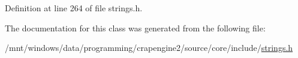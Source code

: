 Definition at line 264 of file strings.\+h.



The documentation for this class was generated from the following file\+:\begin{DoxyCompactItemize}
\item 
/mnt/windows/data/programming/crapengine2/source/core/include/\hyperlink{strings_8h}{strings.\+h}\end{DoxyCompactItemize}
